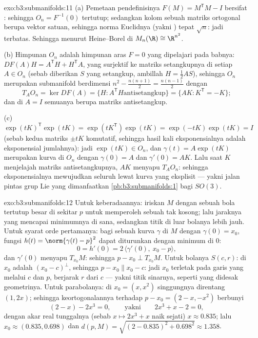 \begin{solution}{exo:b3:submanifolds:11}
(a) Pemetaan pendefinisinya $F(M) = M^{\mathsf T}M - I$ bersifat
: sehingga $O_n = F^{-1}(0)$ tertutup; sedangkan kolom sebuah matriks
ortogonal berupa vektor satuan, sehingga norma Euclidnya
(yakni ) tepat $\sqrt n$: jadi terbatas. Sehingga  menurut
Heine--Borel di $M_n(\R) \cong \R^{n^2}$.

(b) Himpunan $O_n$ adalah himpunan aras $F = 0$ yang dipelajari pada babnya:
$DF(A)H = A^{\mathsf T}H + H^{\mathsf T}A$, yang surjektif ke
matriks setangkupnya di setiap $A \in O_n$ (sebab diberikan $S$ yang setangkup,
ambillah $H = \frac12AS$), sehingga $O_n$ merupakan submanifold
berdimensi $n^2 - \frac{n(n+1)}2 = \frac{n(n-1)}2$ dengan
\[
T_AO_n = \ker DF(A) = \{H : A^{\mathsf T}H \text{
antisetangkup}\} = \{AK : K^{\mathsf T} = -K\} ;
\]
dan di $A = I$ semuanya berupa matriks antisetangkup.

(c) $\exp(tK)^{\mathsf T}\exp(tK) = \exp(tK^{\mathsf T})
\exp(tK) = \exp(-tK)\exp(tK) = I$ (sebab kedua matriks $\pm tK$
komutatif, sehingga hasil kali eksponensialnya adalah eksponensial
jumlahnya): jadi $\exp(tK) \in O_n$, dan $\gamma(t) =
A\exp(tK)$ merupakan kurva di $O_n$ dengan $\gamma(0) = A$ dan
$\gamma'(0) = AK$. Lalu saat $K$ menjelajah matriks antisetangkupnya,
$AK$ menyapu $T_AO_n$: sehingga eksponensialnya mewujudkan seluruh
 lewat kurva yang eksplisit --- yakni jalan pintas grup Lie
yang dimanfaatkan \cref{pb:b3:submanifolds:1} bagi $SO(3)$.
\end{solution}

\begin{solution}{exo:b3:submanifolds:12}
Untuk keberadaannya: iriskan $M$ dengan sebuah bola tertutup besar di sekitar
$p$ untuk memperoleh sebuah  tak kosong; lalu jaraknya yang 
mencapai minimumnya di sana, sedangkan titik di luar bolanya lebih
jauh. Untuk syarat orde pertamanya: bagi sebuah kurva $\gamma$ di $M$
dengan $\gamma(0) = x_0$, fungsi $h(t) = \norm{\gamma(t)
- p}^2$ dapat diturunkan dengan minimum di $0$:
\[
0 = h'(0) = 2\,\langle\gamma'(0),\ x_0 - p\rangle,
\]
dan $\gamma'(0)$ menyapu $T_{x_0}M$: sehingga $p - x_0 \perp
T_{x_0}M$. Untuk bolanya $S(c, r)$:  di $x_0$ adalah
$(x_0 - c)^\perp$, sehingga $p - x_0 \parallel x_0 - c$: jadi $x_0$
terletak pada garis yang melalui $c$ dan $p$, berjarak $r$ dari
$c$ --- yakni titik sinarnya, seperti yang didesak geometrinya. Untuk parabolanya: di
$x_0 = (x, x^2)$ singgungnya direntang $(1, 2x)$;
sehingga keortogonalannya terhadap $p - x_0 = (2 - x, -x^2)$ berbunyi
\[
(2 - x) - 2x^3 = 0,
\qquad\text{yakni}\qquad 2x^3 + x - 2 = 0,
\]
dengan akar real tunggalnya (sebab $x \mapsto 2x^3 + x$ naik
sejati) $x \approx 0.835$; lalu $x_0 \approx (0.835,
0.698)$ dan $d(p, M) = \sqrt{(2 - 0.835)^2 + 0.698^2}
\approx 1.358$.
\end{solution}

